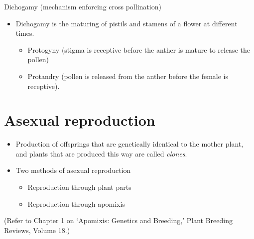 \documentclass[11pt,ignorenonframetext,aspectratio=169]{beamer}
\providecommand{\tightlist}{%
  \setlength{\itemsep}{0pt}\setlength{\parskip}{0pt}}
\begin{document}
\begin{frame}{Dichogamy (mechanism enforcing cross pollination)}
\protect\hypertarget{dichogamy-mechanism-enforcing-cross-pollination}{}
\begin{itemize}
\tightlist
\item
  Dichogamy is the maturing of pistils and stamens of a flower at
  different times.

  \begin{itemize}
  \tightlist
  \item
    Protogyny (stigma is receptive before the anther is mature to
    release the pollen)
  \item
    Protandry (pollen is released from the anther before the female is
    receptive).
  \end{itemize}
\end{itemize}
\end{frame}

\hypertarget{asexual-reproduction}{%
\section{Asexual reproduction}\label{asexual-reproduction}}

\begin{frame}{}
\protect\hypertarget{section-19}{}
\begin{itemize}
\tightlist
\item
  Production of offsprings that are genetically identical to the mother
  plant, and plants that are produced this way are called \emph{clones}.
\item
  Two methods of asexual reproduction

  \begin{itemize}
  \tightlist
  \item
    Reproduction through plant parts
  \item
    Reproduction through apomixis
  \end{itemize}
\end{itemize}

(Refer to Chapter 1 on `Apomixis: Genetics and Breeding,' Plant Breeding
Reviews, Volume 18.)
\end{frame}
\end{document}
